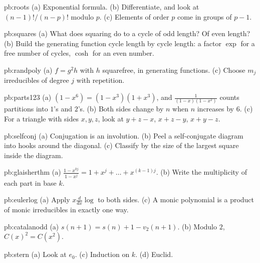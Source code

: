 \begin{hint}{pb:roots}
(a) Exponential formula. (b) Differentiate, and look at $(n-1)!/(n-p)!$ modulo $p$. (c) Elements of order $p$ come in groups
of $p-1$.
\end{hint}

\begin{hint}{pb:squares}
(a) What does squaring do to a cycle of odd length? Of even length? (b) Build the generating function cycle length by cycle
length: a factor $\exp$ for a free number of cycles, $\cosh$ for an even number.
\end{hint}

\begin{hint}{pb:randpoly}
(a) $f=g^2h$ with $h$ squarefree, in generating functions. (c) Choose $m_j$ irreducibles of degree $j$ with repetition.
\end{hint}

\begin{hint}{pb:parts123}
(a) $(1-x^6)=(1-x^3)(1+x^3)$, and $\frac1{(1-x)(1-x^2)}$ counts partitions into $1$'s and $2$'s. (b) Both sides change by $n$
when $n$ increases by $6$. (c) For a triangle with sides $x,y,z$, look at $y+z-x$, $x+z-y$, $x+y-z$.
\end{hint}

\begin{hint}{pb:selfconj}
(a) Conjugation is an involution. (b) Peel a self-conjugate diagram into hooks around the diagonal. (c) Classify by the size of
the largest square inside the diagram.
\end{hint}

\begin{hint}{pb:glaisherthm}
(a) $\frac{1-x^{kj}}{1-x^j}=1+x^j+\dots+x^{(k-1)j}$. (b) Write the multiplicity of each part in base $k$.
\end{hint}

\begin{hint}{pb:eulerlog}
(a) Apply $x\frac d{dx}\log$ to both sides. (c) A monic polynomial is a product of monic irreducibles in exactly one way.
\end{hint}

\begin{hint}{pb:catalanodd}
(a) $s(n+1)=s(n)+1-v_2(n+1)$. (b) Modulo $2$, $C(x)^2=C(x^2)$.
\end{hint}

\begin{hint}{pb:stern}
(a) Look at $e_0$. (c) Induction on $k$. (d) Euclid.
\end{hint}

